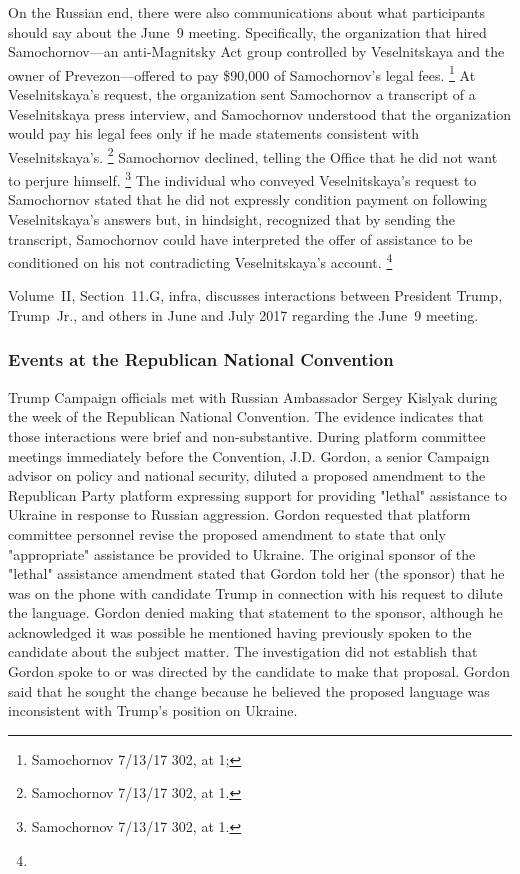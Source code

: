 On the Russian end, there were also communications about what participants should say about the June~9 meeting.
Specifically, the organization that hired Samochornov---an anti-Magnitsky Act group controlled by Veselnitskaya and the owner of Prevezon---offered to pay \$90,000 of Samochornov's legal fees.%
\footnote{Samochornov 7/13/17 302, at 1; }
At Veselnitskaya's request, the organization sent Samochornov a transcript of a Veselnitskaya press interview, and Samochornov understood that the organization would pay his legal fees only if he made statements consistent with Veselnitskaya's.%
\footnote{ Samochornov 7/13/17 302, at 1.}
Samochornov declined, telling the Office that he did not want to perjure himself.%
\footnote{Samochornov 7/13/17 302, at 1.}
The individual who conveyed Veselnitskaya's request to Samochornov stated that he did not expressly condition payment on following Veselnitskaya's answers but, in hindsight, recognized that by sending the transcript, Samochornov could have interpreted the offer of assistance to be conditioned on his not contradicting Veselnitskaya's account.%
\footnote{}

Volume~II, Section~11.G, infra, discusses interactions between President Trump, Trump~Jr., and others in June and July 2017 regarding the June~9 meeting.

\subsubsection{Events at the Republican National Convention}

Trump Campaign officials met with Russian Ambassador Sergey Kislyak during the week of the Republican National Convention.
The evidence indicates that those interactions were brief and non-substantive.
During platform committee meetings immediately before the Convention, J.D. Gordon, a senior Campaign advisor on policy and national security, diluted a proposed amendment to the Republican Party platform expressing support for providing "lethal" assistance to Ukraine in response to Russian aggression.
Gordon requested that platform committee personnel revise the proposed amendment to state that only "appropriate" assistance be provided to Ukraine.
The original sponsor of the "lethal" assistance amendment stated that Gordon told her (the sponsor) that he was on the phone with candidate Trump in connection with his request to dilute the language.
Gordon denied making that statement to the sponsor, although he acknowledged it was possible he mentioned having previously spoken to the candidate about the subject matter.
The investigation did not establish that Gordon spoke to or was directed by the candidate to make that proposal.
Gordon said that he sought the change because he believed the proposed language was inconsistent with Trump's position on Ukraine.

